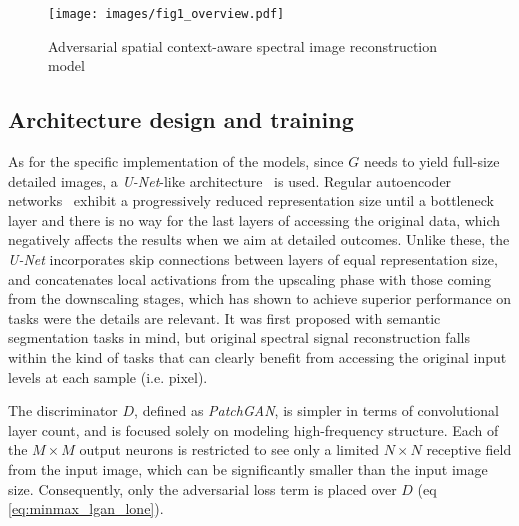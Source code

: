\documentclass{bmvc2k}
\begin{document}
\begin{figure*}
	\begin{center}
        \texttt{[image: images/fig1\_overview.pdf]}
	\end{center}
	\caption{Adversarial spatial context-aware spectral image reconstruction model}
	\label{fig:overview}
\end{figure*}

\subsection{Architecture design and training}
\label{sec:architecture}

As for the specific implementation of the models, since $G$ needs to yield full-size detailed images, a \emph{U-Net}-like architecture~\cite{ronneberger_u-net:_2015} is used.
Regular autoencoder networks~\cite{kingma_auto-encoding_2013} exhibit a progressively reduced representation size until a bottleneck layer and there is no way for the last layers of accessing the original data, which negatively affects the results when we aim at detailed outcomes. 
Unlike these, the \emph{U-Net} incorporates skip connections between layers of equal representation size, and concatenates local activations from the upscaling phase with those coming from the downscaling stages, which has shown to achieve superior performance on tasks were the details are relevant.
It was first proposed with semantic segmentation tasks in mind, but original spectral signal reconstruction falls within the kind of tasks that can clearly benefit from accessing the original input  levels at each sample (i.e. pixel).

The discriminator $D$, defined as \emph{PatchGAN}, is simpler in terms of convolutional layer count, and is focused solely on modeling high-frequency structure. Each of the $M\times M$ output neurons is restricted to see only a limited $N\times N$ receptive field from the input image, which can be significantly smaller than the input image size.
Consequently, only the adversarial loss term is placed over $D$ (eq \ref{eq:minmax_lgan_lone}).
\end{document}
